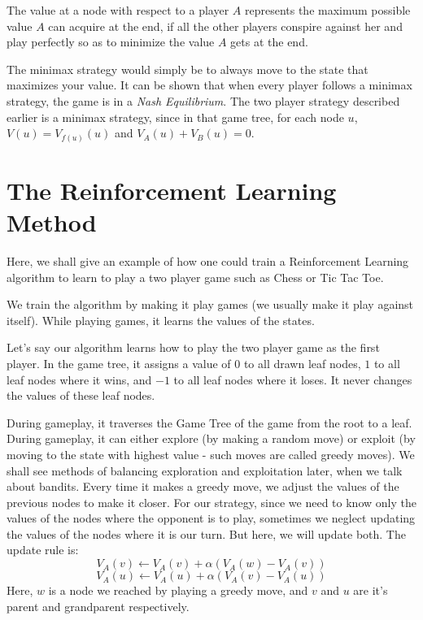 \documentclass[12pt]{report}
\begin{document}
The value at a node with respect to a player $A$ represents the maximum possible value $A$ can acquire at the end, if all the other players conspire against her and play perfectly so as to minimize the value $A$ gets at the end.

The minimax strategy would simply be to always move to the state that maximizes your value. It can be shown that when every player follows a minimax strategy, the game is in a \textit{Nash Equilibrium}. The two player strategy described earlier 
is a minimax strategy, since in that game tree, for each node $u$, $V(u) = V_{f(u)}(u)$ and $V_{A}(u) + V_{B}(u) = 0$.

\section{The Reinforcement Learning Method}
Here, we shall give an example of how one could train a Reinforcement Learning algorithm to learn to play a two player game such as Chess or Tic Tac Toe.

We train the algorithm by making it play games (we usually make it play against itself). While playing games, it learns the values of the states. 

Let's say our algorithm learns how to play the two player game as the first player. In the game tree, it assigns a value of $0$ to all drawn leaf nodes, $1$ to all leaf nodes where it wins,
and $-1$ to all leaf nodes where it loses. It never changes the values of these leaf nodes.

During gameplay, it traverses the Game Tree of the game from the root to a leaf. During gameplay, it can either explore (by making a random move) or exploit (by moving to the state with highest value - such moves are called greedy moves).
We shall see methods of balancing exploration and exploitation later, when we talk about bandits.
Every time it makes a greedy move, we adjust the values of the previous nodes to make it closer. For our strategy, since we need to know only the values of the nodes where the opponent is to play, sometimes we neglect updating the values of the nodes where it is our turn.
But here, we will update both. The update rule is:
\begin{equation}
    V_{A}(v) \leftarrow V_{A}(v) + \alpha(V_{A}(w) - V_{A}(v))
\end{equation}
\begin{equation}
    V_{A}(u) \leftarrow V_{A}(u) + \alpha(V_{A}(v) - V_{A}(u))
\end{equation}
Here, $w$ is a node we reached by playing a greedy move, and $v$ and $u$ are it's parent and grandparent respectively.
\end{document}
